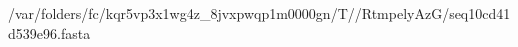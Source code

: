 \documentclass[10pt]{article}
\begin{document}
\begin{texshade}{/var/folders/fc/kqr5vp3x1wg4z_8jvxpwqp1m0000gn/T//RtmpelyAzG/seq10cd41d539e96.fasta}
\hidelogoscale
{}
\showlegend
\end{texshade}
\end{document}
